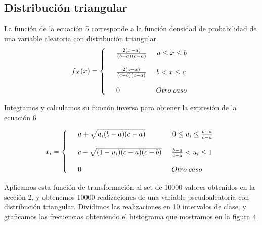 \documentclass[10pt,journal,compsoc]{IEEEtran}
\begin{document}
\subsection{Distribuci\'on triangular}
La funci\'on de la ecuaci\'on 5 corresponde a la funci\'on densidad de probabilidad de una variable aleatoria con distribuci\'on triangular.
\begin{align}
   f_{X}(x) = \left\{
  \begin{array}{rl}
	&\frac{2(x-a)}{(b-a)(c-a)} \hspace{0.5cm} a \le x \le b\\\\
	&\frac{2(c-x)}{(c-b)(c-a)} \hspace{0.5cm} b < x \le c\\\\
	&0 \hspace{1.8 cm} Otro \hspace{0.1cm} caso
  \end{array} \right.
\end{align}


Integramos y calculamos su funci\'on inversa para obtener la expresi\'on de la ecuaci\'on 6

\begin{align}
 x_i = \left\{
  \begin{array}{rl}
	&a+\sqrt{u_i(b-a)(c-a)} \hspace{1.35cm} 0 \le u_i \le \frac{b-a}{c-a}\\\\
	&c-\sqrt{(1-u_i)(c-a)(c-b)} \hspace{0.5cm} \frac{b-a}{c-a} < u_i \le 1\\\\
	&0 \hspace{4.5 cm} Otro \hspace{0.1cm} caso
  \end{array} \right.
\end{align}

Aplicamos esta funci\'on de transformaci\'on al set de 10000 valores obtenidos en la secci\'on 2, y obtenemos
10000 realizaciones de una variable pseudoaleatoria con distribuci\'on triangular.  Dividimos las realizaciones
en 10 intervalos de clase, y graficamos las frecuencias obteniendo el histograma que mostramos en la figura 4.
\end{document}
